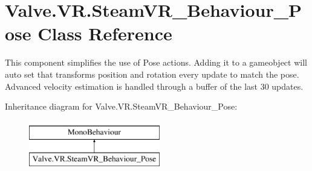 \hypertarget{class_valve_1_1_v_r_1_1_steam_v_r___behaviour___pose}{}\section{Valve.\+V\+R.\+Steam\+V\+R\+\_\+\+Behaviour\+\_\+\+Pose Class Reference}
\label{class_valve_1_1_v_r_1_1_steam_v_r___behaviour___pose}


This component simplifies the use of Pose actions. Adding it to a gameobject will auto set that transform\textquotesingle{}s position and rotation every update to match the pose. Advanced velocity estimation is handled through a buffer of the last 30 updates.  


Inheritance diagram for Valve.\+V\+R.\+Steam\+V\+R\+\_\+\+Behaviour\+\_\+\+Pose\+:\begin{figure}[H]
\begin{center}
\leavevmode
\includegraphics[height=2.000000cm]{class_valve_1_1_v_r_1_1_steam_v_r___behaviour___pose}
\end{center}
\end{figure}
